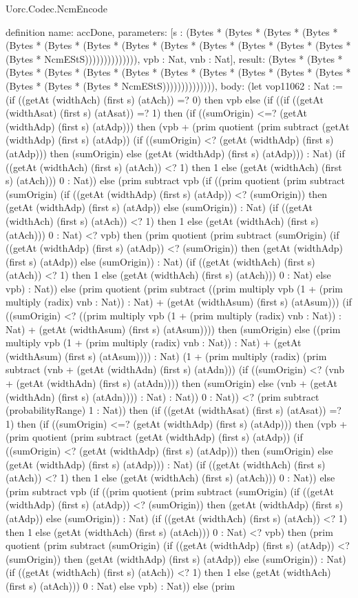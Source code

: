 \begin{lexlean}{Uorc.Codec.NcmEncode}
\begin{semanticmodule}
definition{
  name: accDone,
  parameters: [s : (Bytes * (Bytes * (Bytes * (Bytes * (Bytes * (Bytes * (Bytes * (Bytes * (Bytes * (Bytes * (Bytes * (Bytes * (Bytes * (Bytes * NcmEStS)))))))))))))), vpb : Nat, vnb : Nat],
  result: (Bytes * (Bytes * (Bytes * (Bytes * (Bytes * (Bytes * (Bytes * (Bytes * (Bytes * (Bytes * (Bytes * (Bytes * (Bytes * (Bytes * NcmEStS)))))))))))))),
  body: (let vop11062 : Nat := (if ((getAt (widthAch) (first s) (atAch)) =? 0) then vpb else (if ((if ((getAt (widthAsat) (first s) (atAsat)) =? 1) then (if ((sumOrigin) <=? (getAt (widthAdp) (first s) (atAdp))) then (vpb + (prim quotient (prim subtract (getAt (widthAdp) (first s) (atAdp)) (if ((sumOrigin) <? (getAt (widthAdp) (first s) (atAdp))) then (sumOrigin) else (getAt (widthAdp) (first s) (atAdp))) : Nat) (if ((getAt (widthAch) (first s) (atAch)) <? 1) then 1 else (getAt (widthAch) (first s) (atAch))) 0 : Nat)) else (prim subtract vpb (if ((prim quotient (prim subtract (sumOrigin) (if ((getAt (widthAdp) (first s) (atAdp)) <? (sumOrigin)) then (getAt (widthAdp) (first s) (atAdp)) else (sumOrigin)) : Nat) (if ((getAt (widthAch) (first s) (atAch)) <? 1) then 1 else (getAt (widthAch) (first s) (atAch))) 0 : Nat) <? vpb) then (prim quotient (prim subtract (sumOrigin) (if ((getAt (widthAdp) (first s) (atAdp)) <? (sumOrigin)) then (getAt (widthAdp) (first s) (atAdp)) else (sumOrigin)) : Nat) (if ((getAt (widthAch) (first s) (atAch)) <? 1) then 1 else (getAt (widthAch) (first s) (atAch))) 0 : Nat) else vpb) : Nat)) else (prim quotient (prim subtract ((prim multiply vpb (1 + (prim multiply (radix) vnb : Nat)) : Nat) + (getAt (widthAsum) (first s) (atAsum))) (if ((sumOrigin) <? ((prim multiply vpb (1 + (prim multiply (radix) vnb : Nat)) : Nat) + (getAt (widthAsum) (first s) (atAsum)))) then (sumOrigin) else ((prim multiply vpb (1 + (prim multiply (radix) vnb : Nat)) : Nat) + (getAt (widthAsum) (first s) (atAsum)))) : Nat) (1 + (prim multiply (radix) (prim subtract (vnb + (getAt (widthAdn) (first s) (atAdn))) (if ((sumOrigin) <? (vnb + (getAt (widthAdn) (first s) (atAdn)))) then (sumOrigin) else (vnb + (getAt (widthAdn) (first s) (atAdn)))) : Nat) : Nat)) 0 : Nat)) <? (prim subtract (probabilityRange) 1 : Nat)) then (if ((getAt (widthAsat) (first s) (atAsat)) =? 1) then (if ((sumOrigin) <=? (getAt (widthAdp) (first s) (atAdp))) then (vpb + (prim quotient (prim subtract (getAt (widthAdp) (first s) (atAdp)) (if ((sumOrigin) <? (getAt (widthAdp) (first s) (atAdp))) then (sumOrigin) else (getAt (widthAdp) (first s) (atAdp))) : Nat) (if ((getAt (widthAch) (first s) (atAch)) <? 1) then 1 else (getAt (widthAch) (first s) (atAch))) 0 : Nat)) else (prim subtract vpb (if ((prim quotient (prim subtract (sumOrigin) (if ((getAt (widthAdp) (first s) (atAdp)) <? (sumOrigin)) then (getAt (widthAdp) (first s) (atAdp)) else (sumOrigin)) : Nat) (if ((getAt (widthAch) (first s) (atAch)) <? 1) then 1 else (getAt (widthAch) (first s) (atAch))) 0 : Nat) <? vpb) then (prim quotient (prim subtract (sumOrigin) (if ((getAt (widthAdp) (first s) (atAdp)) <? (sumOrigin)) then (getAt (widthAdp) (first s) (atAdp)) else (sumOrigin)) : Nat) (if ((getAt (widthAch) (first s) (atAch)) <? 1) then 1 else (getAt (widthAch) (first s) (atAch))) 0 : Nat) else vpb) : Nat)) else (prim }
\end{semanticmodule}
\end{lexlean}
